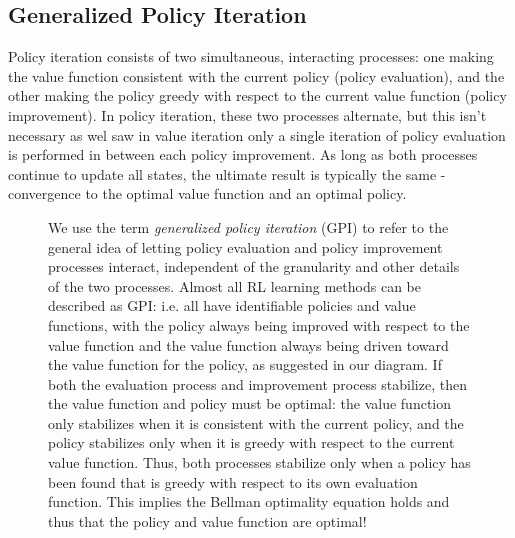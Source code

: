 \documentclass[12pt]{article}
\begin{document}
\subsection{Generalized Policy Iteration}
Policy iteration consists of two simultaneous, interacting processes: one making the value function consistent with the current policy (policy evaluation), and the other making the policy greedy with respect to the current value function (policy improvement). In policy iteration, these two processes alternate, but this isn't necessary as wel saw in value iteration only a single iteration of policy evaluation is performed in between each policy improvement.  As long as both processes continue to update all states, the ultimate result is typically the same - convergence to the optimal value function and an optimal policy.
\begin{figure}[h]
  \centering
  \caption{\footnotesize We use the term \emph{generalized policy iteration} (GPI) to refer to the general idea of letting policy evaluation and policy improvement processes interact, independent of the granularity and other details of the two processes. Almost all RL learning methods can be described as GPI: i.e. all have identifiable policies and value functions, with the policy always being improved with respect to the value function and the value function always being driven toward the value function for the policy, as suggested in our diagram. If both the evaluation process and improvement process stabilize, then the value function and policy must be optimal: the value function only stabilizes when it is consistent with the current policy, and the policy stabilizes only when it is greedy with respect to the current value function. Thus, both processes stabilize only when a policy has been found that is greedy with respect to its own evaluation function. This implies the Bellman optimality equation holds and thus that the policy and value function are optimal!}
\end{figure}
\end{document}
